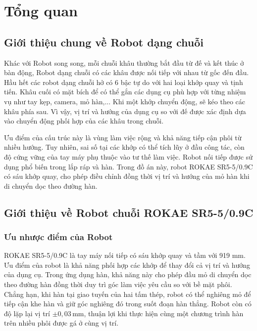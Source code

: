 \chapter{Tổng quan}

\section{Giới thiệu chung về Robot dạng chuỗi}

Khác với Robot song song, mỗi chuỗi khâu thường bắt đầu từ đế và kết thúc ở bàn động, Robot dạng chuỗi có các khâu được nối tiếp với nhau từ gốc đến đầu. Hầu hết các robot dạng chuỗi hở có 6 bậc tự do với hai loại khớp quay và tịnh tiến. Khâu cuối có mặt bích để có thể gắn các dụng cụ phù hợp với từng nhiệm vụ như tay kẹp, camera, mỏ hàn,... Khi một khớp chuyển động, sẽ kéo theo các khâu phía sau. Vì vậy, vị trí và hướng của dụng cụ so với đế được xác định dựa vào chuyển động phối hợp của các khâu trong chuỗi.

Ưu điểm của cấu trúc này là vùng làm việc rộng và khả năng tiếp cận phôi từ nhiều hướng. Tuy nhiên, sai số tại các khớp có thể tích lũy ở đầu công tác, còn độ cứng vững của tay máy phụ thuộc vào tư thế làm việc. Robot nối tiếp được sử dụng phổ biến trong lắp ráp và hàn. Trong đồ án này, robot ROKAE SR5-5/0.9C có sáu khớp quay, cho phép điều chỉnh đồng thời vị trí và hướng của mỏ hàn khi di chuyển dọc theo đường hàn.

\section{Giới thiệu về Robot chuỗi ROKAE SR5-5/0.9C}

\subsection{Ưu nhược điểm của Robot}

ROKAE SR5-5/0.9C là tay máy nối tiếp có sáu khớp quay và tầm với 919 mm. Ưu điểm của robot là khả năng phối hợp các khớp để thay đổi cả vị trí và hướng của dụng cụ. Trong ứng dụng hàn, khả năng này cho phép đầu mỏ di chuyển dọc theo đường hàn đồng thời duy trì góc làm việc yêu cầu so với bề mặt phôi. Chẳng hạn, khi hàn tại giao tuyến của hai tấm thép, robot có thể nghiêng mỏ để tiếp cận khe hàn và giữ góc nghiêng đó trong suốt đoạn hàn thẳng. Robot còn có độ lặp lại vị trí \(\pm0{,}03\,\mathrm{mm}\), thuận lợi khi thực hiện cùng một chương trình hàn trên nhiều phôi được gá ở cùng vị trí.


